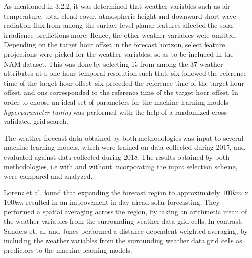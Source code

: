 \par As mentioned in 3.2.2, it was determined that weather variables such as air temperature, total cloud cover, atmospheric height and downward short-wave radiation flux from among the surface-level planar features affected the solar irradiance predictions more. Hence, the other weather variables were omitted. Depending on the target hour offset in the forecast horizon, select feature projections were picked for the weather variables, so as to be included in the NAM dataset. This was done by selecting 13 from among the 37 weather attributes at a one-hour temporal resolution such that, six followed the reference time of the target hour offset, six preceded the reference time of the target hour offset, and one corresponded to the reference time of the target hour offset. In order to choose an ideal set of parameters for the machine learning models, \textit{hyperparameter tuning} was performed with the help of a randomized cross-validated grid search. 

\par The weather forecast data obtained by both methodologies was input to several machine learning models, which were trained on data collected during 2017, and evaluated against data collected during 2018. The results obtained by both methodologies, i.e with and without incorporating the input selection scheme, were compared and analyzed.

\vspace{0.5cm}

\par Lorenz et al. \cite{expansion_lorenz} found that expanding the forecast region to approximately $100 km$ x $100 km$ resulted in an improvement in day-ahead solar forecasting. They performed a spatial averaging across the region, by taking  an arithmetic mean of the weather variables from the surrounding weather data grid cells. In contrast, Sanders et. al. \cite{publication_sanders} and Jones \cite{thesis_zach} performed a distance-dependent weighted averaging, by including the weather variables from the surrounding weather data grid cells as predictors to the machine learning models.

